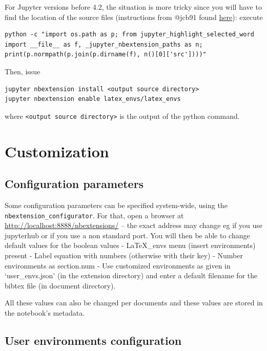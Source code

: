 For Jupyter versions before 4.2, the situation is more tricky since you
will have to find the location of the source files (instructions from
@jcb91 found
\href{https://github.com/jcb91/jupyter_highlight_selected_word}{here}):
execute

\begin{verbatim}
python -c "import os.path as p; from jupyter_highlight_selected_word import __file__ as f, _jupyter_nbextension_paths as n; print(p.normpath(p.join(p.dirname(f), n()[0]['src'])))"
\end{verbatim}

Then, issue

\begin{verbatim}
jupyter nbextension install <output source directory>
jupyter nbextension enable latex_envs/latex_envs
\end{verbatim}

where \texttt{\textless{}output\ source\ directory\textgreater{}} is the
output of the python command.

    \section{Customization}\label{customization}

\subsection{Configuration parameters}\label{configuration-parameters}

Some configuration parameters can be specified system-wide, using the
\texttt{nbextension\_configurator}. For that, open a browser at
\url{http://localhost:8888/nbextensions/} -- the exact address may
change eg if you use jupyterhub or if you use a non standard port. You
will then be able to change default values for the boolean values -
LaTeX\_envs menu (insert environments) present - Label equation with
numbers (otherwise with their \label{} key) - Number environments as
section.num - Use customized environments as given in `user\_envs.json'
(in the extension directory) and enter a default filename for the bibtex
file (in document directory).

All these values can also be changed per documents and these values are
stored in the notebook's metadata.

\subsection{User environments
configuration}\label{user-environments-configuration}

